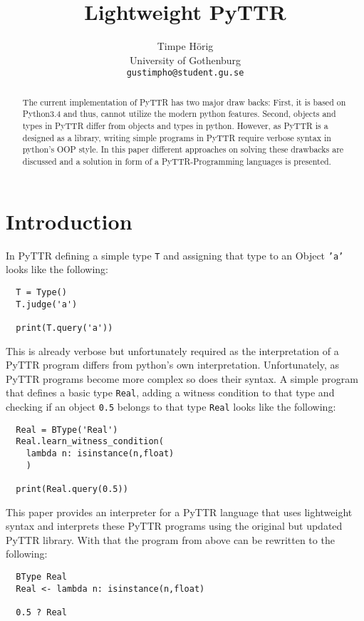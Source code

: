 \documentclass[11pt]{article}
\title{Lightweight PyTTR}
\author{Timpe Hörig \\
  University of Gothenburg \\
  \texttt{gustimpho@student.gu.se}
}
\begin{document}
\maketitle
\begin{abstract}
The current implementation of PyTTR has two major draw backs: First, it is based on Python3.4 and thus, cannot utilize the modern python features. Second, objects and types in PyTTR differ from objects and types in python. However, as PyTTR is a designed as a library, writing simple programs in PyTTR require verbose syntax in python's OOP style. In this paper different approaches on solving these drawbacks are discussed and a solution in form of a PyTTR-Programming languages is presented.
\end{abstract}

\section{Introduction}
In PyTTR defining a simple type \texttt{T} and assigning that type to an Object \texttt{'a'} looks like the following:\\

\begin{verbatim}
  T = Type()
  T.judge('a')
  
  print(T.query('a'))
\end{verbatim}

This is already verbose but unfortunately required as the interpretation of a PyTTR program differs from python's own interpretation. Unfortunately, as PyTTR programs become more complex so does their syntax. A simple program that defines a basic type \texttt{Real}, adding a witness condition to that type and checking if an object \texttt{0.5} belongs to that type \texttt{Real} looks like the following:

\begin{verbatim}
  Real = BType('Real')
  Real.learn_witness_condition(
    lambda n: isinstance(n,float)
    )

  print(Real.query(0.5))
\end{verbatim}

This paper provides an interpreter for a PyTTR language that uses lightweight syntax and interprets these PyTTR programs using the original but updated PyTTR library. With that the program from above can be rewritten to the following:

\begin{verbatim}
  BType Real
  Real <- lambda n: isinstance(n,float)

  0.5 ? Real
\end{verbatim}
\end{document}
